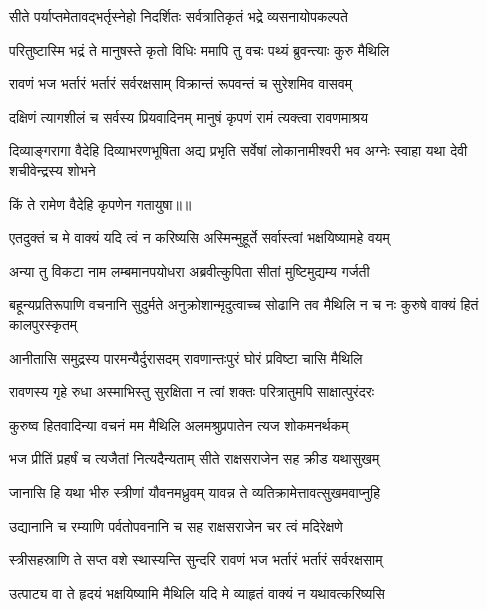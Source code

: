 \twolineshloka
{सीते पर्याप्तमेतावद्भर्तृस्नेहो निदर्शितः}
{सर्वत्रातिकृतं भद्रे व्यसनायोपकल्पते} %

\twolineshloka
{परितुष्टास्मि भद्रं ते मानुषस्ते कृतो विधिः}
{ममापि तु वचः पथ्यं ब्रुवन्त्याः कुरु मैथिलि} %

\twolineshloka
{रावणं भज भर्तारं भर्तारं सर्वरक्षसाम्}
{विक्रान्तं रूपवन्तं च सुरेशमिव वासवम्} %

\twolineshloka
{दक्षिणं त्यागशीलं च सर्वस्य प्रियवादिनम्}
{मानुषं कृपणं रामं त्यक्त्वा रावणमाश्रय} %

\threelineshloka
{दिव्याङ्गरागा वैदेहि दिव्याभरणभूषिता}
{अद्य प्रभृति सर्वेषां लोकानामीश्वरी भव}
{अग्नेः स्वाहा यथा देवी शचीवेन्द्रस्य शोभने} %

{किं ते रामेण वैदेहि कृपणेन गतायुषा॥॥} %

\addtocounter{shlokacount}{1}

\twolineshloka
{एतदुक्तं च मे वाक्यं यदि त्वं न करिष्यसि}
{अस्मिन्मुहूर्ते सर्वास्त्वां भक्षयिष्यामहे वयम्} %

\twolineshloka
{अन्या तु विकटा नाम लम्बमानपयोधरा}
{अब्रवीत्कुपिता सीतां मुष्टिमुद्यम्य गर्जती} %

\threelineshloka
{बहून्यप्रतिरूपाणि वचनानि सुदुर्मते}
{अनुक्रोशान्मृदुत्वाच्च सोढानि तव मैथिलि}
{न च नः कुरुषे वाक्यं हितं कालपुरस्कृतम्} %

\twolineshloka
{आनीतासि समुद्रस्य पारमन्यैर्दुरासदम्}
{रावणान्तःपुरं घोरं प्रविष्टा चासि मैथिलि} %

\twolineshloka
{रावणस्य गृहे रुधा अस्माभिस्तु सुरक्षिता}
{न त्वां शक्तः परित्रातुमपि साक्षात्पुरंदरः} %

\twolineshloka
{कुरुष्व हितवादिन्या वचनं मम मैथिलि}
{अलमश्रुप्रपातेन त्यज शोकमनर्थकम्} %

\twolineshloka
{भज प्रीतिं प्रहर्षं च त्यजैतां नित्यदैन्यताम्}
{सीते राक्षसराजेन सह क्रीड यथासुखम्} %

\twolineshloka
{जानासि हि यथा भीरु स्त्रीणां यौवनमध्रुवम्}
{यावन्न ते व्यतिक्रामेत्तावत्सुखमवाप्नुहि} %

\twolineshloka
{उद्यानानि च रम्याणि पर्वतोपवनानि च}
{सह राक्षसराजेन चर त्वं मदिरेक्षणे} %

\twolineshloka
{स्त्रीसहस्राणि ते सप्त वशे स्थास्यन्ति सुन्दरि}
{रावणं भज भर्तारं भर्तारं सर्वरक्षसाम्} %

\twolineshloka
{उत्पाट्य वा ते हृदयं भक्षयिष्यामि मैथिलि}
{यदि मे व्याहृतं वाक्यं न यथावत्करिष्यसि} %

